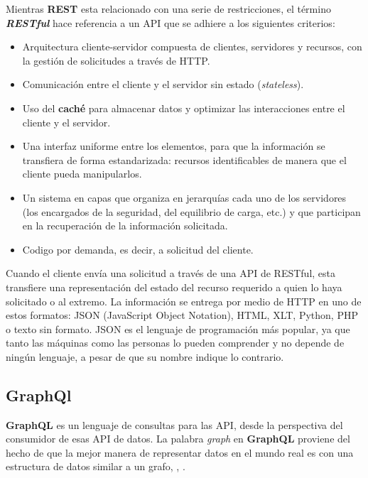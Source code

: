 Mientras \textbf{REST} esta relacionado con una serie de restricciones, el t\'ermino \textit{\textbf{RESTful}} hace referencia a un API que se adhiere a los siguientes criterios:

\begin{itemize}
	\item Arquitectura cliente-servidor compuesta de clientes, servidores y recursos, con la gestión de solicitudes a través de HTTP.
	\item Comunicación entre el cliente y el servidor \gls{sin estado} (\textit{stateless}).
	\item Uso del \textbf{caché} para almacenar datos  y optimizar las interacciones entre el cliente y el servidor.
	\item Una interfaz uniforme entre los elementos, para que la información se transfiera de forma estandarizada: recursos identificables de manera que el cliente pueda manipularlos.
	\item Un sistema en capas que organiza en jerarquías  cada uno de los servidores (los encargados de la seguridad, del equilibrio de carga, etc.) y que participan en la recuperación de la información solicitada.
	\item\gls{Codigo por demanda}, es decir, a solicitud del cliente. 
\end{itemize}

 
Cuando el cliente envía una solicitud a través de una API de RESTful, esta transfiere una representación del estado del recurso requerido a quien lo haya solicitado o al extremo. La información se entrega por medio de HTTP en uno de estos formatos: JSON (JavaScript Object Notation), HTML, XLT, Python, PHP o texto sin formato. JSON es el lenguaje de programación más popular, ya que tanto las máquinas como las personas lo pueden comprender y no depende de ningún lenguaje, a pesar de que su nombre indique lo contrario. 



\subsection{GraphQl}

\textbf{GraphQL} es un lenguaje de consultas para las API, desde la perspectiva del consumidor  de esas API de datos. La palabra \textit{graph} en \textbf{GraphQL} proviene del hecho de que la mejor manera de representar datos en el mundo real es con una estructura de datos similar a un grafo, \cite{Buna2021},  \cite{Banks2018}.


